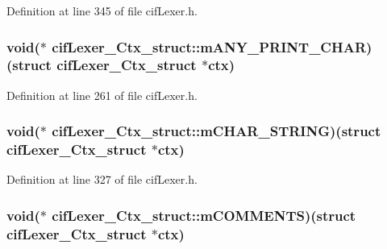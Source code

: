 Definition at line 345 of file cif\-Lexer.\-h.

\hypertarget{structcif_lexer___ctx__struct_ac6a416d19049d743e454b7b3d4c33c3b}{
\subsubsection[{m\-A\-N\-Y\-\_\-\-P\-R\-I\-N\-T\-\_\-\-C\-H\-A\-R}]{\setlength{\rightskip}{0pt plus 5cm}void($\ast$ cif\-Lexer\-\_\-\-Ctx\-\_\-struct\-::m\-A\-N\-Y\-\_\-\-P\-R\-I\-N\-T\-\_\-\-C\-H\-A\-R)(struct {\bf cif\-Lexer\-\_\-\-Ctx\-\_\-struct} $\ast$ctx)}}\label{structcif_lexer___ctx__struct_ac6a416d19049d743e454b7b3d4c33c3b}


Definition at line 261 of file cif\-Lexer.\-h.

\hypertarget{structcif_lexer___ctx__struct_a416dc4bbfba66221f0cda6fbb3de7527}{
\subsubsection[{m\-C\-H\-A\-R\-\_\-\-S\-T\-R\-I\-N\-G}]{\setlength{\rightskip}{0pt plus 5cm}void($\ast$ cif\-Lexer\-\_\-\-Ctx\-\_\-struct\-::m\-C\-H\-A\-R\-\_\-\-S\-T\-R\-I\-N\-G)(struct {\bf cif\-Lexer\-\_\-\-Ctx\-\_\-struct} $\ast$ctx)}}\label{structcif_lexer___ctx__struct_a416dc4bbfba66221f0cda6fbb3de7527}


Definition at line 327 of file cif\-Lexer.\-h.

\hypertarget{structcif_lexer___ctx__struct_a85596d7d3fea310b5fa527cff1aa6125}{
\subsubsection[{m\-C\-O\-M\-M\-E\-N\-T\-S}]{\setlength{\rightskip}{0pt plus 5cm}void($\ast$ cif\-Lexer\-\_\-\-Ctx\-\_\-struct\-::m\-C\-O\-M\-M\-E\-N\-T\-S)(struct {\bf cif\-Lexer\-\_\-\-Ctx\-\_\-struct} $\ast$ctx)}}\label{structcif_lexer___ctx__struct_a85596d7d3fea310b5fa527cff1aa6125}


